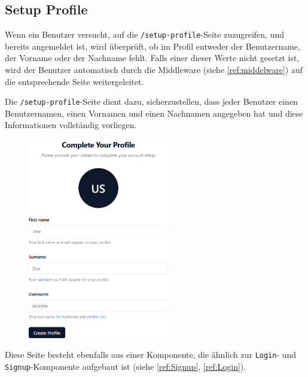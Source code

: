 \begin{inhalt}
\clearpage

\newpage

\section{Setup Profile}

Wenn ein Benutzer versucht, auf die \texttt{/setup-profile}-Seite zuzugreifen, und bereits angemeldet ist, wird überprüft, ob im Profil entweder der Benutzername, der Vorname oder der Nachname fehlt.  
Falls einer dieser Werte nicht gesetzt ist, wird der Benutzer automatisch durch die Middleware (siehe \ref{ref:middelware}) auf die entsprechende Seite weitergeleitet.

\vspace{0.25cm}

Die \texttt{/setup-profile}-Seite dient dazu, sicherzustellen, dass jeder Benutzer einen Benutzernamen, einen Vornamen und einen Nachnamen angegeben hat und diese Informationen vollständig vorliegen.

\begin{figure}[!htb]
\centering
\includegraphics[width=0.55\textwidth]{files/Thomas/pics/Website/setup-profile/setup-profile.png}
\caption[Bildbezeichnung für Abbildungsverzeichnis]{}
\label{fig:gehaeuse_internet_bild}
\end{figure}

\clearpage

Diese Seite besteht ebenfalls aus einer Komponente, die ähnlich zur \texttt{Login}- und \texttt{Signup}-Komponente aufgebaut ist (siehe \ref{ref:Signup}, \ref{ref:Login}).


\end{inhalt}
